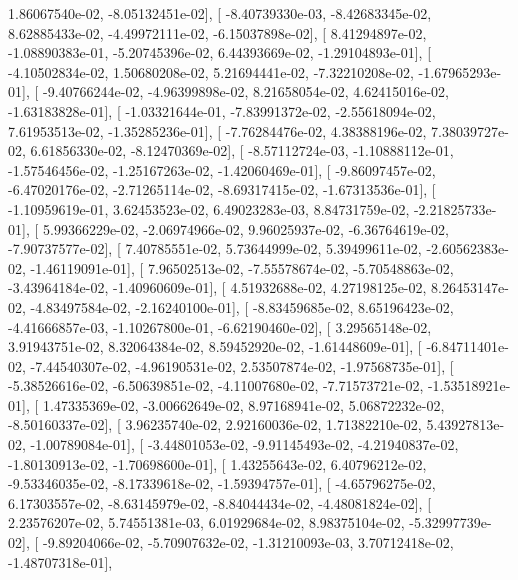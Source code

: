 \documentclass{article}
\begin{document}
          1.86067540e-02,  -8.05132451e-02],
       [ -8.40739330e-03,  -8.42683345e-02,   8.62885433e-02,
         -4.49972111e-02,  -6.15037898e-02],
       [  8.41294897e-02,  -1.08890383e-01,  -5.20745396e-02,
          6.44393669e-02,  -1.29104893e-01],
       [ -4.10502834e-02,   1.50680208e-02,   5.21694441e-02,
         -7.32210208e-02,  -1.67965293e-01],
       [ -9.40766244e-02,  -4.96399898e-02,   8.21658054e-02,
          4.62415016e-02,  -1.63183828e-01],
       [ -1.03321644e-01,  -7.83991372e-02,  -2.55618094e-02,
          7.61953513e-02,  -1.35285236e-01],
       [ -7.76284476e-02,   4.38388196e-02,   7.38039727e-02,
          6.61856330e-02,  -8.12470369e-02],
       [ -8.57112724e-03,  -1.10888112e-01,  -1.57546456e-02,
         -1.25167263e-02,  -1.42060469e-01],
       [ -9.86097457e-02,  -6.47020176e-02,  -2.71265114e-02,
         -8.69317415e-02,  -1.67313536e-01],
       [ -1.10959619e-01,   3.62453523e-02,   6.49023283e-03,
          8.84731759e-02,  -2.21825733e-01],
       [  5.99366229e-02,  -2.06974966e-02,   9.96025937e-02,
         -6.36764619e-02,  -7.90737577e-02],
       [  7.40785551e-02,   5.73644999e-02,   5.39499611e-02,
         -2.60562383e-02,  -1.46119091e-01],
       [  7.96502513e-02,  -7.55578674e-02,  -5.70548863e-02,
         -3.43964184e-02,  -1.40960609e-01],
       [  4.51932688e-02,   4.27198125e-02,   8.26453147e-02,
         -4.83497584e-02,  -2.16240100e-01],
       [ -8.83459685e-02,   8.65196423e-02,  -4.41666857e-03,
         -1.10267800e-01,  -6.62190460e-02],
       [  3.29565148e-02,   3.91943751e-02,   8.32064384e-02,
          8.59452920e-02,  -1.61448609e-01],
       [ -6.84711401e-02,  -7.44540307e-02,  -4.96190531e-02,
          2.53507874e-02,  -1.97568735e-01],
       [ -5.38526616e-02,  -6.50639851e-02,  -4.11007680e-02,
         -7.71573721e-02,  -1.53518921e-01],
       [  1.47335369e-02,  -3.00662649e-02,   8.97168941e-02,
          5.06872232e-02,  -8.50160337e-02],
       [  3.96235740e-02,   2.92160036e-02,   1.71382210e-02,
          5.43927813e-02,  -1.00789084e-01],
       [ -3.44801053e-02,  -9.91145493e-02,  -4.21940837e-02,
         -1.80130913e-02,  -1.70698600e-01],
       [  1.43255643e-02,   6.40796212e-02,  -9.53346035e-02,
         -8.17339618e-02,  -1.59394757e-01],
       [ -4.65796275e-02,   6.17303557e-02,  -8.63145979e-02,
         -8.84044434e-02,  -4.48081824e-02],
       [  2.23576207e-02,   5.74551381e-03,   6.01929684e-02,
          8.98375104e-02,  -5.32997739e-02],
       [ -9.89204066e-02,  -5.70907632e-02,  -1.31210093e-03,
          3.70712418e-02,  -1.48707318e-01],
\end{document}
